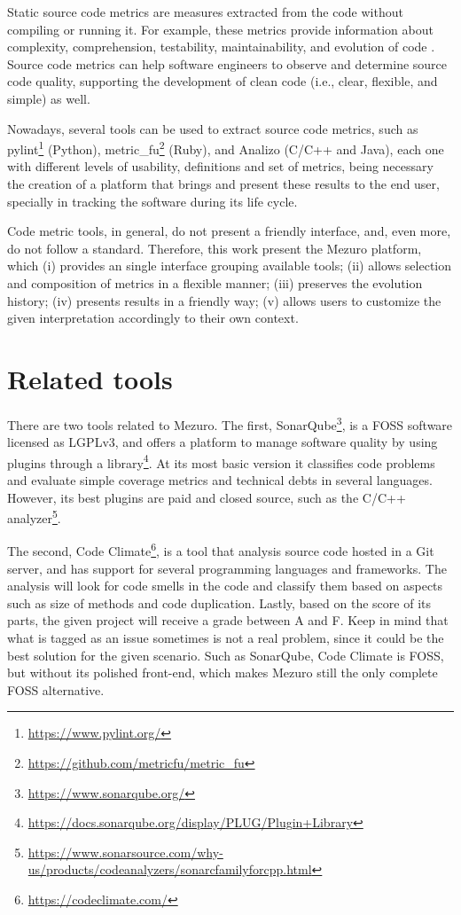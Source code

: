 \documentclass{llncs}
\begin{document}
Static source code metrics are measures extracted from the code without compiling
or running it. For example, these metrics provide information about complexity, comprehension,
testability, maintainability, and evolution of code \cite{mills1988}. Source code metrics can help software engineers to
observe and determine source code quality, supporting the development of clean code (i.e., clear, flexible, and simple) as well\cite{martin2008}.

Nowadays, several tools can be
used to extract source code metrics, such as
pylint\footnote{\url{https://www.pylint.org/}} (Python),
metric\_fu\footnote{\url{https://github.com/metricfu/metric_fu}} (Ruby), and
Analizo (C/C++ and Java)\cite{terceiro2010analizo}, each one with
different levels of usability, definitions and set of metrics, being necessary
the creation of a platform that brings and present these results to the end
user, specially in tracking the software during its life cycle.

Code metric tools, in general, do not present a friendly interface, and,
even more, do not follow a standard. Therefore, this work present the
Mezuro platform, which (i) provides an single interface grouping available tools;
(ii) allows selection and composition of metrics in a flexible manner;
(iii) preserves the evolution history;
(iv) presents results in a friendly way;
(v) allows users to customize the given interpretation accordingly to their own context.

\section{Related tools}

There are two tools related to Mezuro. The first,
SonarQube\footnote{\url{https://www.sonarqube.org/}},
is a FOSS software licensed as LGPLv3, and offers a platform to manage software
quality by using plugins through a 
library\footnote{\url{https://docs.sonarqube.org/display/PLUG/Plugin+Library}}.
At its most basic version it classifies code problems and evaluate simple
coverage metrics and technical debts in several languages. However, its best
plugins are paid and closed source, such as the
C/C++ analyzer\footnote{\url{https://www.sonarsource.com/why-us/products/codeanalyzers/sonarcfamilyforcpp.html}}.

The second, Code Climate\footnote{\url{https://codeclimate.com/}}, is a tool
that analysis source code hosted in a Git server, and has support for several
programming languages and frameworks. The analysis will look for code smells
in the code and classify them based on aspects such as size of methods and
code duplication. Lastly, based on the score of its parts, the given project
will receive a grade between A and F. Keep in mind that what is tagged as an
issue sometimes is not a real problem, since it could be the best solution for
the given scenario. Such as SonarQube, Code Climate is FOSS, but without its
polished front-end, which makes Mezuro still the only complete FOSS alternative.
\end{document}
